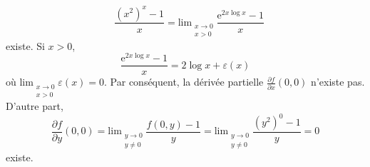 {\begin{enumerate}
{\[{\begin{smallmatrix}
\end{smallmatrix}}\frac {(x^2)^x-1}x = 
\mathrm{lim}_{\begin{smallmatrix} x \to 0\\ x > 0
\end{smallmatrix}}\frac {\mathrm e^{2x \log x} -1}x
\]
existe. Si $x>0$,
\[
\frac {\mathrm e^{2x \log x} -1}x = 2 \log x + \varepsilon(x)
\]
o\`u $\mathrm{lim}_{\begin{smallmatrix} x \to 0\\ x > 0
\end{smallmatrix}}\varepsilon(x)=0$. Par cons\'equent,
 la d\'eriv\'ee partielle
$\frac{\partial f}{\partial x}(0,0)$ n'existe pas.
D'autre part,
\[
\frac{\partial f}{\partial y}(0,0)=
\mathrm{lim}_{\begin{smallmatrix} y \to 0\\ y \ne 0
\end{smallmatrix}}\frac {f(0,y) -1}y =
\mathrm{lim}_{\begin{smallmatrix} y \to 0\\ y \ne 0
\end{smallmatrix}}\frac {(y^2)^0-1}y = 0
\]
existe.}
\end{enumerate}
}